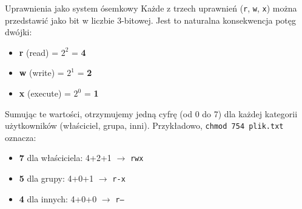 \begin{importantbox}{Uprawnienia jako system ósemkowy}
Każde z trzech uprawnień (\texttt{r}, \texttt{w}, \texttt{x}) można przedstawić jako bit w liczbie 3-bitowej. Jest to naturalna konsekwencja potęg dwójki:
\begin{itemize}
    \item \textbf{r} (read) = $2^2$ = \textbf{4}
    \item \textbf{w} (write) = $2^1$ = \textbf{2}
    \item \textbf{x} (execute) = $2^0$ = \textbf{1}
\end{itemize}
Sumując te wartości, otrzymujemy jedną cyfrę (od 0 do 7) dla każdej kategorii użytkowników (właściciel, grupa, inni). Przykładowo, \texttt{chmod 754 plik.txt} oznacza:
\begin{itemize}
    \item \textbf{7} dla właściciela: 4+2+1 $\rightarrow$ \texttt{rwx}
    \item \textbf{5} dla grupy: 4+0+1 $\rightarrow$ \texttt{r-x}
    \item \textbf{4} dla innych: 4+0+0 $\rightarrow$ \texttt{r---}
\end{itemize}
\end{importantbox}


